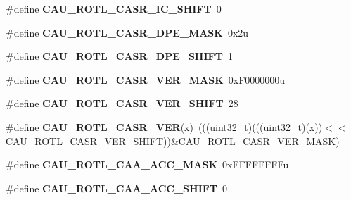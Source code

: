 \begin{DoxyCompactItemize}
\item 
\#define {\bfseries C\+A\+U\+\_\+\+R\+O\+T\+L\+\_\+\+C\+A\+S\+R\+\_\+\+I\+C\+\_\+\+S\+H\+I\+FT}~0\hypertarget{group__CAU__Register__Masks_gafe14ff3ce4f7d2b10d0b202cf03546af}{}\label{group__CAU__Register__Masks_gafe14ff3ce4f7d2b10d0b202cf03546af}

\item 
\#define {\bfseries C\+A\+U\+\_\+\+R\+O\+T\+L\+\_\+\+C\+A\+S\+R\+\_\+\+D\+P\+E\+\_\+\+M\+A\+SK}~0x2u\hypertarget{group__CAU__Register__Masks_ga834d584c25afb7faf4c9f0b87b5b9619}{}\label{group__CAU__Register__Masks_ga834d584c25afb7faf4c9f0b87b5b9619}

\item 
\#define {\bfseries C\+A\+U\+\_\+\+R\+O\+T\+L\+\_\+\+C\+A\+S\+R\+\_\+\+D\+P\+E\+\_\+\+S\+H\+I\+FT}~1\hypertarget{group__CAU__Register__Masks_ga4d0da6b7c4575317872d875392fb0272}{}\label{group__CAU__Register__Masks_ga4d0da6b7c4575317872d875392fb0272}

\item 
\#define {\bfseries C\+A\+U\+\_\+\+R\+O\+T\+L\+\_\+\+C\+A\+S\+R\+\_\+\+V\+E\+R\+\_\+\+M\+A\+SK}~0x\+F0000000u\hypertarget{group__CAU__Register__Masks_ga6d8f0ea43478a075cf2a0c9745bd211c}{}\label{group__CAU__Register__Masks_ga6d8f0ea43478a075cf2a0c9745bd211c}

\item 
\#define {\bfseries C\+A\+U\+\_\+\+R\+O\+T\+L\+\_\+\+C\+A\+S\+R\+\_\+\+V\+E\+R\+\_\+\+S\+H\+I\+FT}~28\hypertarget{group__CAU__Register__Masks_gad4f7b9dfa3900a1a24b391b7c515d0e4}{}\label{group__CAU__Register__Masks_gad4f7b9dfa3900a1a24b391b7c515d0e4}

\item 
\#define {\bfseries C\+A\+U\+\_\+\+R\+O\+T\+L\+\_\+\+C\+A\+S\+R\+\_\+\+V\+ER}(x)~(((uint32\+\_\+t)(((uint32\+\_\+t)(x))$<$$<$C\+A\+U\+\_\+\+R\+O\+T\+L\+\_\+\+C\+A\+S\+R\+\_\+\+V\+E\+R\+\_\+\+S\+H\+I\+FT))\&C\+A\+U\+\_\+\+R\+O\+T\+L\+\_\+\+C\+A\+S\+R\+\_\+\+V\+E\+R\+\_\+\+M\+A\+SK)\hypertarget{group__CAU__Register__Masks_ga8dc294f60e158cddfefa8728889a8763}{}\label{group__CAU__Register__Masks_ga8dc294f60e158cddfefa8728889a8763}

\item 
\#define {\bfseries C\+A\+U\+\_\+\+R\+O\+T\+L\+\_\+\+C\+A\+A\+\_\+\+A\+C\+C\+\_\+\+M\+A\+SK}~0x\+F\+F\+F\+F\+F\+F\+F\+Fu\hypertarget{group__CAU__Register__Masks_ga0aa131c13271bf31c8f88c3c7dce8729}{}\label{group__CAU__Register__Masks_ga0aa131c13271bf31c8f88c3c7dce8729}

\item 
\#define {\bfseries C\+A\+U\+\_\+\+R\+O\+T\+L\+\_\+\+C\+A\+A\+\_\+\+A\+C\+C\+\_\+\+S\+H\+I\+FT}~0\hypertarget{group__CAU__Register__Masks_gac36dbf4828c435c589cbcee42b1356d3}{}\label{group__CAU__Register__Masks_gac36dbf4828c435c589cbcee42b1356d3}


\end{DoxyCompactItemize}
